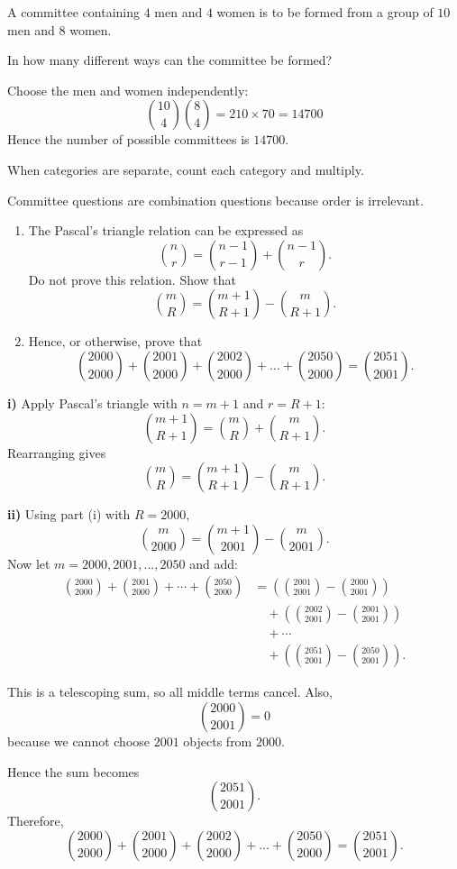 \begin{problem}
A committee containing $4$ men and $4$ women is to be formed from a group of $10$ men and $8$ women.

In how many different ways can the committee be formed?
\end{problem}

\begin{solution}
Choose the men and women independently:
\[
\binom{10}{4}\binom{8}{4} = 210 \times 70 = 14700
\]
Hence the number of possible committees is $\boxed{14700}$.
\end{solution}

\begin{takeaways}
\item When categories are separate, count each category and multiply.
\item Committee questions are combination questions because order is irrelevant.
\end{takeaways}

\begin{problem}
\begin{enumerate}[label=\roman*)]
\item The Pascal's triangle relation can be expressed as
\[
\binom{n}{r} = \binom{n-1}{r-1} + \binom{n-1}{r}.
\]
Do not prove this relation. Show that
\[
\binom{m}{R} = \binom{m+1}{R+1} - \binom{m}{R+1}.
\]

\item Hence, or otherwise, prove that
\[
\binom{2000}{2000} + \binom{2001}{2000} + \binom{2002}{2000} + \dots + \binom{2050}{2000} = \binom{2051}{2001}.
\]
\end{enumerate}
\end{problem}

\begin{solution}
\textbf{i)} Apply Pascal's triangle with $n=m+1$ and $r=R+1$:
\[
\binom{m+1}{R+1} = \binom{m}{R} + \binom{m}{R+1}.
\]
Rearranging gives
\[
\binom{m}{R} = \binom{m+1}{R+1} - \binom{m}{R+1}.
\]

\textbf{ii)} Using part (i) with $R=2000$,
\[
\binom{m}{2000} = \binom{m+1}{2001} - \binom{m}{2001}.
\]
Now let $m=2000,2001,\dots,2050$ and add:
\begin{align*}
\binom{2000}{2000} + \binom{2001}{2000} + \cdots + \binom{2050}{2000}
&= \left(\binom{2001}{2001} - \binom{2000}{2001}\right) \\
&\quad + \left(\binom{2002}{2001} - \binom{2001}{2001}\right) \\
&\quad + \cdots \\
&\quad + \left(\binom{2051}{2001} - \binom{2050}{2001}\right).
\end{align*}

This is a telescoping sum, so all middle terms cancel. Also,
\[
\binom{2000}{2001} = 0
\]
because we cannot choose $2001$ objects from $2000$.

Hence the sum becomes
\[
\binom{2051}{2001}.
\]
Therefore,
\[
\binom{2000}{2000} + \binom{2001}{2000} + \binom{2002}{2000} + \dots + \binom{2050}{2000} = \boxed{\binom{2051}{2001}}.
\]
\end{solution}

